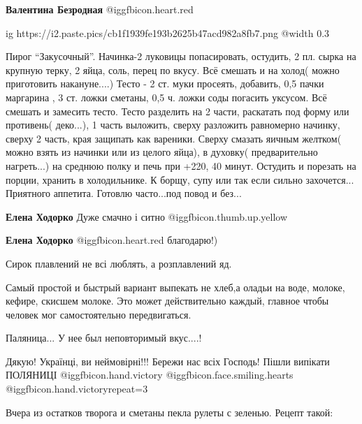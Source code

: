 \begin{itemize}
\textbf{Валентина Безродная} @igg{fbicon.heart.red}


\ifcmt
  ig https://i2.paste.pics/cb1f1939fe193b2625b47acd982a8fb7.png
  @width 0.3
\fi


Пирог \enquote{Закусочный}. Начинка-2 луковицы попасировать, остудить, 2 пл. сырка на
крупную терку, 2 яйца, соль, перец по вкусу. Всё смешать и на холод( можно
приготовить накануне....) Тесто - 2 ст. муки просеять, добавить, 0,5 пачки
маргарина , 3 ст. ложки сметаны, 0,5 ч. ложки соды погасить уксусом. Всё
смешать и замесить тесто. Тесто разделить на 2 части, раскатать под форму или
противень( деко...), 1 часть выложить, сверху разложить равномерно начинку,
сверху 2 часть, края защипать как вареники. Сверху смазать яичным желтком(
можно взять из начинки или из целого яйца), в духовку( предварительно
нагреть...) на среднюю полку и печь при +220, 40 минут. Остудить и порезать на
порции, хранить в холодильнике. К борщу, супу или так если сильно захочется...
Приятного аппетита. Готовлю часто...под повод и без...

\begin{itemize} %
\textbf{Елена Ходорко} Дуже смачно і ситно @igg{fbicon.thumb.up.yellow} 

\textbf{Елена Ходорко} @igg{fbicon.heart.red} благодарю!)


Сирок плавлений не всі люблять, а розплавлений яд.
\end{itemize} %


Самый простой и быстрый вариант выпекать не хлеб,а оладьи на воде, молоке,
кефире, скисшем молоке. Это может действительно каждый, главное чтобы человек
мог самостоятельно передвигаться.

Паляница...
У нее был неповторимый вкус....!


Дякую! Українці, ви неймовірні!!! Бережи нас всіх Господь! Пішли випікати ПОЛЯНИЦІ
@igg{fbicon.hand.victory}  @igg{fbicon.face.smiling.hearts}  @igg{fbicon.hand.victory}{repeat=3}


Вчера из остатков творога и сметаны пекла рулеты с зеленью. Рецепт такой:


\end{itemize}
